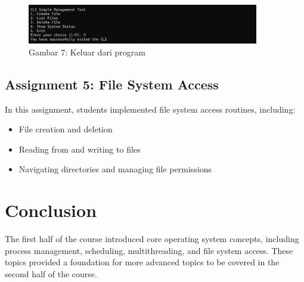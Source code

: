 \documentclass[12pt]{article}
\begin{document}
        \begin{figure}[h]
            \centering
            \includegraphics[width=0.9\textwidth]{asset/a4-output-5.png}
                        \caption{Gambar 7: Keluar dari program}
            \label{fig:a4-output-5}
        \end{figure}

\subsection{Assignment 5: File System Access}
In this assignment, students implemented file system access routines, including:
\begin{itemize}
    \item File creation and deletion
    \item Reading from and writing to files
    \item Navigating directories and managing file permissions
\end{itemize}

\section{Conclusion}
The first half of the course introduced core operating system concepts, including process management, scheduling, multithreading, and file system access. These topics provided a foundation for more advanced topics to be covered in the second half of the course.
\end{document}
